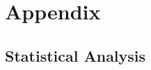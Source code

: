 \documentclass{article}
\begin{document}






\appendix
\newpage
\section{Appendix}

\subsection{Statistical Analysis}
\label{app:statistical_analysis}
\end{document}
